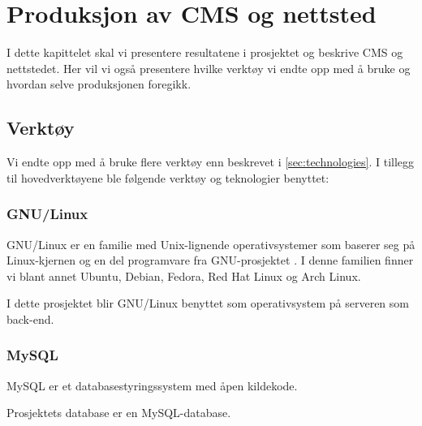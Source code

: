 \cleardoublepage
\chapter{Produksjon av CMS og nettsted}
\label{chap:implementation} 


I dette kapittelet skal vi presentere resultatene i prosjektet og beskrive CMS og nettstedet. Her vil vi også presentere hvilke verktøy vi endte opp med å bruke og hvordan selve produksjonen foregikk.

\section{Verktøy}
Vi endte opp med å bruke flere verktøy enn beskrevet i  \ref{sec:technologies}. 
I tillegg til hovedverktøyene ble følgende verktøy og teknologier benyttet:

\subsection{GNU/Linux}
GNU/Linux er en familie med Unix-lignende operativsystemer som baserer seg på Linux-kjernen \cite{kernel_org} og en del programvare fra GNU-prosjektet \cite{gnu_org}. I denne familien finner vi blant annet Ubuntu, Debian, Fedora, Red Hat Linux og Arch Linux.

I dette prosjektet blir GNU/Linux benyttet som operativsystem på serveren som  back-end.

\subsection{MySQL}
MySQL \cite{oracle2019am} er et databasestyringssystem med åpen kildekode.

Prosjektets database er en MySQL-database.



